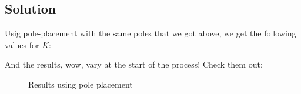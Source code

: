 \documentclass[10pt,a4paper]{article}
\begin{document}
\subsection*{Solution}
Usig pole-placement with the same poles that we got above, we get the following values for $K$:

\begin{center}
\end{center}

And the results, wow, vary at the start of the process! Check them out:

	\begin{figure}[H]
			\centering
            \caption{Results using pole placement}
            \label{fig:Q2-xu}
	\end{figure}
\end{document}
